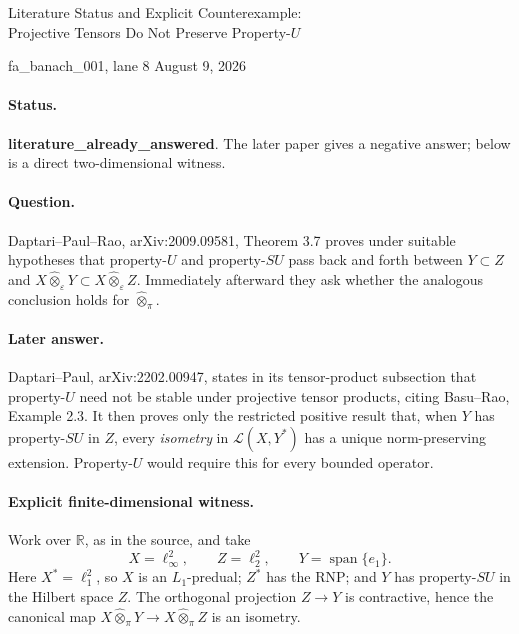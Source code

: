 \documentclass[10pt]{article}
\newcommand{\R}{\mathbb R}
\begin{document}
\begin{center}
{\Large Literature Status and Explicit Counterexample:\\Projective Tensors Do Not Preserve Property-$U$\par}
\vspace{0.45em}
{fa\_banach\_001, lane 8 \quad August 9, 2026\par}
\end{center}
\vspace{0.35em}

\paragraph{Status.}
\textbf{literature\_already\_answered}. The later paper gives a negative answer; below is a direct two-dimensional witness.

\paragraph{Question.}
Daptari--Paul--Rao, arXiv:2009.09581, Theorem 3.7 proves under suitable hypotheses that property-$U$ and property-$SU$ pass back and forth between $Y\subset Z$ and
$X\widehat\otimes_\varepsilon Y\subset X\widehat\otimes_\varepsilon Z$.
Immediately afterward they ask whether the analogous conclusion holds for $\widehat\otimes_\pi$.

\paragraph{Later answer.}
Daptari--Paul, arXiv:2202.00947, states in its tensor-product subsection that property-$U$ need not be stable under projective tensor products, citing Basu--Rao, Example 2.3. It then proves only the restricted positive result that, when $Y$ has property-$SU$ in $Z$, every \emph{isometry} in $\mathcal L(X,Y^*)$ has a unique norm-preserving extension. Property-$U$ would require this for every bounded operator.

\paragraph{Explicit finite-dimensional witness.}
Work over $\R$, as in the source, and take
\[
 X=\ell_\infty^2,\qquad Z=\ell_2^2,\qquad Y=\operatorname{span}\{e_1\}.
\]
Here $X^*=\ell_1^2$, so $X$ is an $L_1$-predual; $Z^*$ has the RNP; and $Y$ has property-$SU$ in the Hilbert space $Z$. The orthogonal projection $Z\to Y$ is contractive, hence the canonical map $X\widehat\otimes_\pi Y\to X\widehat\otimes_\pi Z$ is an isometry.
\end{document}
